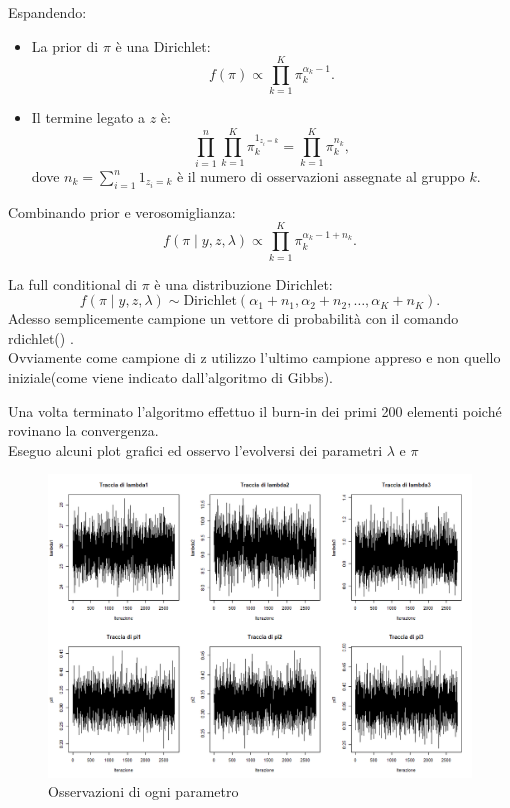 \documentclass[a4paper,12pt]{article}
\begin{document}
\begin{itemize}
\begin{itemize}
			Espandendo:
			\begin{itemize}
				\item La prior di $\pi$ è una Dirichlet:
				\[
				f(\pi) \propto \prod_{k=1}^K \pi_k^{\alpha_k - 1}.
				\]
				
				\item Il termine legato a $z$ è:
				\[
				\prod_{i=1}^n \prod_{k=1}^K \pi_k^{1_{z_i=k}} = \prod_{k=1}^K \pi_k^{n_k},
				\]
				dove $n_k = \sum_{i=1}^n 1_{z_i=k}$ è il numero di osservazioni assegnate al gruppo $k$.
			\end{itemize}
			
			Combinando prior e verosomiglianza:
			\[
			f(\pi \mid y, z, \lambda) \propto \prod_{k=1}^K \pi_k^{\alpha_k - 1 + n_k}.
			\]
			
			La full conditional di $\pi$ è una distribuzione Dirichlet:
			\[
			f(\pi \mid y, z, \lambda) \sim \text{Dirichlet}(\alpha_1 + n_1, \alpha_2 + n_2, \dots, \alpha_K + n_K).
			\]
			Adesso semplicemente campione un vettore di probabilità con il comando rdichlet() .\\
			Ovviamente come campione di z utilizzo l'ultimo campione appreso e non quello iniziale(come viene indicato dall'algoritmo di Gibbs).
		\end{itemize}
		Una volta terminato l'algoritmo effettuo il burn-in dei primi 200 elementi poiché rovinano la convergenza.\\
		Eseguo alcuni plot grafici ed osservo l'evolversi dei parametri $\lambda$ e $\pi$
		\begin{figure}[h] %
			\centering %
			\includegraphics[width=1.1\textwidth]{plotfinali2.png} %
			\caption{Osservazioni di ogni parametro} %
			\label{fig:immagine} %
		\end{figure}
	\end{itemize}
	
\end{document}
